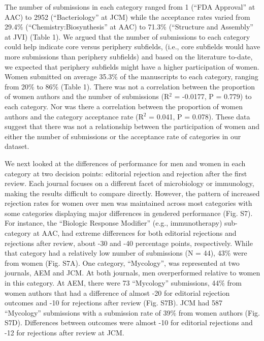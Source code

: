 \documentclass[11pt,]{article}
\begin{document}
The number of submissions in each category ranged from 1 (``FDA
Approval'' at AAC) to 2952 (``Bacteriology'' at JCM) while the
acceptance rates varied from 29.4\% (``Chemistry:Biosynthesis'' at AAC)
to 71.3\% (``Structure and Assembly'' at JVI) (Table 1). We argued that
the number of submissions to each category could help indicate core
versus periphery subfields, (i.e., core subfields would have more
submissions than periphery subfields) and based on the literature
to-date, we expected that periphery subfields might have a higher
participation of women. Women submitted on average 35.3\% of the
manuscripts to each category, ranging from 20\% to 86\% (Table 1). There
was not a correlation between the proportion of women authors and the
number of submissions (R\({^2}\) = -0.0177, P = 0.779) to each category.
Nor was there a correlation between the proportion of women authors and
the category acceptance rate (R\({^2}\) = 0.041, P = 0.078). These data
suggest that there was not a relationship between the participation of
women and either the number of submissions or the acceptance rate of
categories in our dataset.

We next looked at the differences of performance for men and women in
each category at two decision points: editorial rejection and rejection
after the first review. Each journal focuses on a different facet of
microbiology or immunology, making the results difficult to compare
directly. However, the pattern of increased rejection rates for women
over men was maintained across most categories with some categories
displaying major differences in gendered performance (Fig. S7). For
instance, the ``Biologic Response Modifier'' (e.g., immunotherapy)
sub-category at AAC, had extreme differences for both editorial
rejections and rejections after review, about -30 and -40 percentage
points, respectively. While that category had a relatively low number of
submissions (N = 44), 43\% were from women (Fig. S7A). One category,
``Mycology'', was represented at two journals, AEM and JCM. At both
journals, men overperformed relative to women in this category. At AEM,
there were 73 ``Mycology'' submissions, 44\% from women authors that had
a difference of almost -20 for editorial rejection outcomes and -10 for
rejections after review (Fig. S7B). JCM had 587 ``Mycology'' submissions
with a submission rate of 39\% from women authors (Fig. S7D).
Differences between outcomes were almost -10 for editorial rejections
and -12 for rejections after review at JCM.
\end{document}
